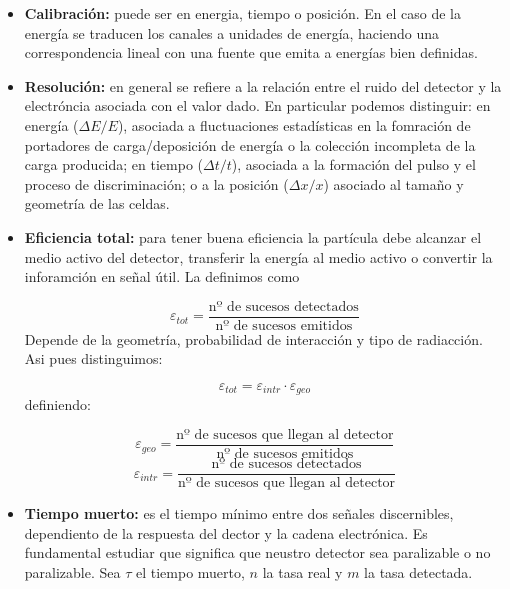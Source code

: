 \begin{itemize}
    \item \textbf{Calibración:} puede ser en energia, tiempo o posición. En el caso de la energía se traducen los canales a unidades de energía, haciendo una correspondencia lineal con una fuente que emita a energías bien definidas.
    \item \textbf{Resolución:} en general se refiere a la relación entre el ruido del detector y la electróncia asociada con el valor dado. En particular podemos distinguir: en energía ($\Delta E / E$), asociada a fluctuaciones estadísticas en la fomración de portadores de carga/deposición de energía o la colección incompleta de la carga producida; en tiempo ($\Delta t / t$), asociada a la formación del pulso y el proceso de discriminación; o a la posición ($\Delta x / x$) asociado al tamaño y geometría de las celdas.
    \item \textbf{Eficiencia total:} para tener buena eficiencia la partícula debe alcanzar el medio activo del detector, transferir la energía al medio activo o convertir  la inforamción en señal útil. La definimos como

    \begin{equation}
        \varepsilon_{tot} = \frac{\text{nº de sucesos detectados}}{\text{nº de sucesos emitidos}}
    \end{equation}
    Depende de la geometría, probabilidad de interacción y tipo de radiacción. Asi pues distinguimos:

    \begin{equation}
        \varepsilon_{tot} = \varepsilon_{intr} \cdot \varepsilon_{geo}
    \end{equation}
    definiendo: 

    \begin{equation}
        \varepsilon_{geo} = \frac{\text{nº de sucesos que llegan al detector}}{\text{nº de sucesos emitidos}}
    \end{equation}
    \begin{equation}
        \varepsilon_{intr} = \frac{\text{nº de sucesos detectados}}{\text{nº de sucesos que llegan al detector}}
    \end{equation}
    \item \textbf{Tiempo muerto:} es el tiempo mínimo entre dos señales discernibles, dependiento de la respuesta del dector y la cadena electrónica. Es fundamental estudiar que significa que neustro detector sea paralizable o no paralizable.  Sea $\tau$ el tiempo muerto, $n$ la tasa real y $m$ la tasa detectada.
    

\end{itemize}
